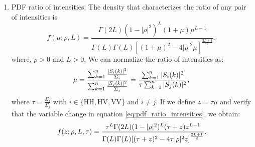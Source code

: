 \documentclass[remotesensing,article,submit,pdftex,moreauthors]{Definitions/mdpi}
\begin{document}
\begin{enumerate}[leftmargin=*,labelsep=4.9mm]
\item PDF ratio of intensities: The density that characterizes the ratio of any pair of intensities is
\begin{equation}
	f(\mu;\rho,L)=\frac{\Gamma(2L)(1-|\rho|^2)^{L}(1+\mu)\mu^{L-1}}{\Gamma(L)\Gamma(L)\left[(1+\mu)^2-4|\rho|^2 \mu \right]^{\frac{2L+1}{2}}},
\label{eq:pdf_ratio_intensities}
\end{equation}
where, $\rho>0$ and $L>0$. We can normalize the ratio of intensities as: 
\begin{equation}
 \mu=\frac{\sum_{k=1}^{n}\frac{|S_i(k)|^2}{\Sigma_i}}{\sum_{k=1}^{n}\frac{|S_j(k)|^2}{\Sigma_j}}=\frac{\sum_{k=1}^{n}|S_i(k)|^2}{\tau\sum_{k=1}^{n}|S_j(k)|^2},\\
 \label{eq:ratio_intensities_norm}
\end{equation}
where $\tau=\frac{\Sigma_i}{\Sigma_j}$ with $i\in \{\text{HH}, \text{HV}, \text{VV}\}$ and $i \neq j$. If we define $z=\tau \mu$ and verify that the variable change in equation \eqref{eq:pdf_ratio_intensities}, we obtain: 
\begin{equation}
	f(z;\rho,L,\tau)=\frac{\tau^L\Gamma(2L)(1-|\rho|^2)^{L}(\tau+z)z^{L-1}}{\Gamma(L)\Gamma(L)\left[(\tau+z)^2-4\tau|\rho|^2z \right]^{\frac{2L+1}{2}}}.\\
 \label{eq:pdf_ratio_intensities_tau_z}
\end{equation}


\end{enumerate}
\end{document}

